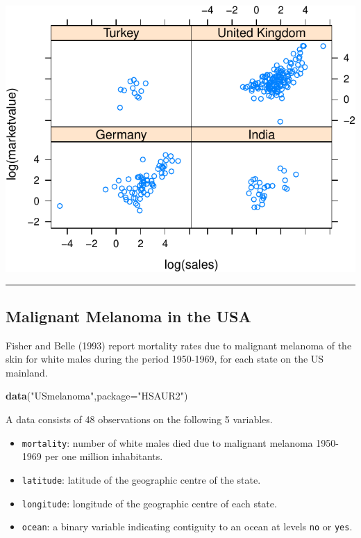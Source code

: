 \documentclass[]{article}
\newenvironment{Shaded}{\begin{snugshade}}{\end{snugshade}}
\newcommand{\KeywordTok}[1]{\textcolor[rgb]{0.13,0.29,0.53}{\textbf{{#1}}}}
\newcommand{\DataTypeTok}[1]{\textcolor[rgb]{0.13,0.29,0.53}{{#1}}}
\newcommand{\StringTok}[1]{\textcolor[rgb]{0.31,0.60,0.02}{{#1}}}
\newcommand{\NormalTok}[1]{{#1}}
\numberwithin{equation}{section}
\begin{document}
\includegraphics{index_files/figure-latex/unnamed-chunk-257-1.pdf}

\begin{center}\rule{0.5\linewidth}{\linethickness}\end{center}

\subsection{Malignant Melanoma in the
USA}\label{malignant-melanoma-in-the-usa}

Fisher and Belle (1993) report mortality rates due to malignant melanoma
of the skin for white males during the period 1950-1969, for each state
on the US mainland.

\begin{Shaded}
\begin{Highlighting}[]
\KeywordTok{data}\NormalTok{(}\StringTok{"USmelanoma"}\NormalTok{,}\DataTypeTok{package=}\StringTok{"HSAUR2"}\NormalTok{)}
\end{Highlighting}
\end{Shaded}

A data consists of 48 observations on the following 5 variables.

\begin{itemize}
\item
  \texttt{mortality}: number of white males died due to malignant
  melanoma 1950-1969 per one million inhabitants.
\item
  \texttt{latitude}: latitude of the geographic centre of the state.
\item
  \texttt{longitude}: longitude of the geographic centre of each state.
\item
  \texttt{ocean}: a binary variable indicating contiguity to an ocean at
  levels \texttt{no} or \texttt{yes}.
\end{itemize}
\end{document}
